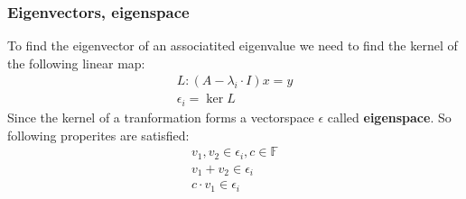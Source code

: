 \subsubsection{Eigenvectors, eigenspace}
To find the eigenvector of an associatited eigenvalue we need to find the kernel of the following linear map:
\begin{align*}
    L:  (A - \lambda_i \cdot I) x = y \\
    \epsilon_i = \ker L
\end{align*}
Since the kernel of a tranformation forms a vectorspace  \( \epsilon \) called \textbf{eigenspace}. So following properites are satisfied:
\begin{align*}
    v_1, v_2 \in \epsilon_i, c \in \mathbb{F} \\
    v_1 + v_2 \in \epsilon_i                  \\
    c \cdot v_1 \in \epsilon_i                \\
\end{align*}
